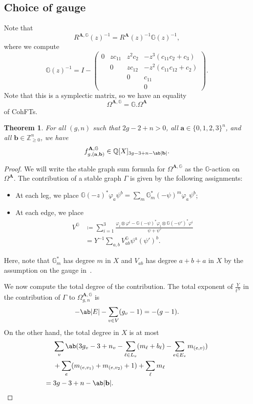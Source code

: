 \documentclass[10pt]{amsart}
\newtheorem{thm}{Theorem}[section]
\theoremstyle{definition}
\theoremstyle{remark}
\theoremstyle{plain}
\theoremstyle{definition}
\theoremstyle{remark}
\newcommand{\G}{\mathbb{G}}
\newcommand{\Z}{\mathbb{Z}}
\newcommand{\Q}{\mathbb{Q}}
\newcommand{\ba}{\mathbf{a}}
\newcommand{\bb}{\mathbf{b}}
\newcommand{\bA}{\mathbf{A}}
\newcommand{\1}{\mathbf{1}}
\newcommand{\2}{\mathbf{2}}
\newcommand{\3}{\mathbf{3}}
\numberwithin{equation}{section}
\begin{document}
\subsection{Choice of gauge}%
\label{sub:Choice of gauge}

Note that
\[ R^{\bA,\G}(z)^{-1} = R^{\bA}(z)^{-1} \G(z)^{-1}, \]
where we compute
\[ \G(z)^{-1} = I - \begin{pmatrix}
    0 & zc_{11} & z^2c_2 & -z^3 (c_{11} c_2 + c_3) \\
    & 0 & z c_{12} & -z^2 (c_{11} c_{12} + c_2) \\
    & & 0 & c_{11} \\
    & & & 0
\end{pmatrix}.
\]
Note that this is a symplectic matrix, so we have an equality
\[ \Omega^{\bA, \G} = \G.\Omega^{\bA} \]
of CohFTs.

\begin{thm}
    For all $(g,n)$ such that $2g-2+n > 0$, all $\ba \in \{0,1,2,3\}^n$, and all $\bb \in \Z_{\geq 0}^n$, we have
    \[ f_{g,(\ba,\bb)}^{\bA,\G} \in \Q[X]_{3g-3+n-\ab|\bb|}. \]
\end{thm}

\begin{proof}
    We will write the stable graph sum formula for $\Omega^{\bA, \G}$ as the $\G$-action on $\Omega^{\bA}$. The contribution of a stable graph $\Gamma$ is given by the following assignments:
    \begin{itemize}
        \item At each leg, we place $\G(-z)^* \varphi_a \psi^b = \sum_m \G_m^* (-\psi)^m \varphi_a \psi^b$;
        \item At each edge, we place
            \begin{align*}
                V^{\G} &\coloneqq \sum_{i=1}^3 \frac{\varphi_i \otimes \varphi^i - \G(-\psi)^* \varphi_i \otimes \G(-\psi')^* \varphi^i}{\psi+\psi'} \\
                &= Y^{-1} \sum_{a,b} V_{ab}^{\G} \psi^a (\psi')^b.
            \end{align*}
    \end{itemize}
    Here, note that $\G_m^*$ has degree $m$ in $X$ and $V_{ab}$ has degree $a+b+a$ in $X$ by the assumption on the gauge in~.

    We now compute the total degree of the contribution. The total exponent of $\frac{Y}{t^N}$ in the contribution of $\Gamma$ to $\Omega_{g,n}^{\bA, \G}$ is
    \[ -\ab|E| - \sum_{v \in V} (g_v-1) = -(g-1). \]
    On the other hand, the total degree in $X$ is at most
    \begin{align*}
        &\sum_v \ab(3g_v-3+n_v - \sum_{\ell \in L_v} (m_{\ell} + b_{\ell}) - \sum_{e \in E_v} m_{(e,v)})\\
        &+ \sum_e (m_{(e,v_1)} + m_{(e,v_2)}+1) + \sum_{\ell} m_{\ell} \\
        ={}& 3g-3+n - \ab|\bb|. \qedhere
    \end{align*}
\end{proof}
\end{document}
